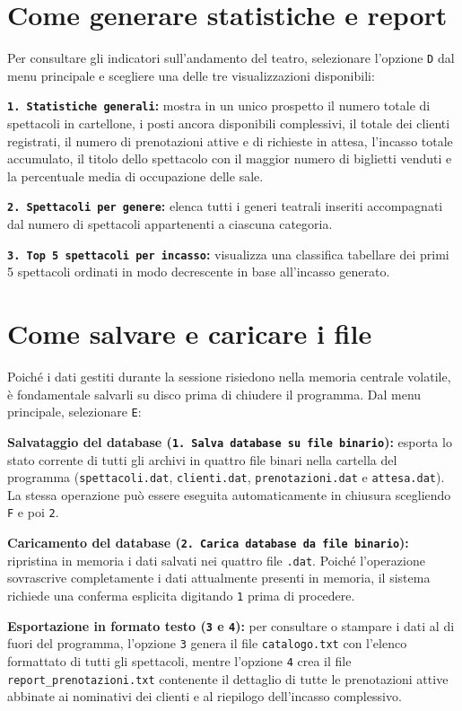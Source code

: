 \documentclass[11pt,a4paper,oneside,openany]{book}
\newenvironment{listacomp}{%
    \small
    \begin{list}{\textendash}{%
        \setlength{\topsep}{2pt}%
        \setlength{\partopsep}{0pt}%
        \setlength{\itemsep}{1pt}%
        \setlength{\parsep}{0pt}%
        \setlength{\leftmargin}{1.2em}%
    }%
}{%
    \end{list}%
}
\begin{document}
\section{Come generare statistiche e report}
Per consultare gli indicatori sull'andamento del teatro, selezionare l'opzione \texttt{D} dal menu principale e scegliere una delle tre visualizzazioni disponibili:
\begin{listacomp}
    \item \textbf{\texttt{1. Statistiche generali}:} mostra in un unico prospetto il numero totale di spettacoli in cartellone, i posti ancora disponibili complessivi, il totale dei clienti registrati, il numero di prenotazioni attive e di richieste in attesa, l'incasso totale accumulato, il titolo dello spettacolo con il maggior numero di biglietti venduti e la percentuale media di occupazione delle sale.
    \item \textbf{\texttt{2. Spettacoli per genere}:} elenca tutti i generi teatrali inseriti accompagnati dal numero di spettacoli appartenenti a ciascuna categoria.
    \item \textbf{\texttt{3. Top 5 spettacoli per incasso}:} visualizza una classifica tabellare dei primi 5 spettacoli ordinati in modo decrescente in base all'incasso generato.
\end{listacomp}

\section{Come salvare e caricare i file}
Poiché i dati gestiti durante la sessione risiedono nella memoria centrale volatile, è fondamentale salvarli su disco prima di chiudere il programma. Dal menu principale, selezionare \texttt{E}:
\begin{listacomp}
    \item \textbf{Salvataggio del database (\texttt{1. Salva database su file binario}):} esporta lo stato corrente di tutti gli archivi in quattro file binari nella cartella del programma (\texttt{spettacoli.dat}, \texttt{clienti.dat}, \texttt{prenotazioni.dat} e \texttt{attesa.dat}). La stessa operazione può essere eseguita automaticamente in chiusura scegliendo \texttt{F} e poi \texttt{2}.
    \item \textbf{Caricamento del database (\texttt{2. Carica database da file binario}):} ripristina in memoria i dati salvati nei quattro file \texttt{.dat}. Poiché l'operazione sovrascrive completamente i dati attualmente presenti in memoria, il sistema richiede una conferma esplicita digitando \texttt{1} prima di procedere.
    \item \textbf{Esportazione in formato testo (\texttt{3} e \texttt{4}):} per consultare o stampare i dati al di fuori del programma, l'opzione \texttt{3} genera il file \texttt{catalogo.txt} con l'elenco formattato di tutti gli spettacoli, mentre l'opzione \texttt{4} crea il file \texttt{report\_prenotazioni.txt} contenente il dettaglio di tutte le prenotazioni attive abbinate ai nominativi dei clienti e al riepilogo dell'incasso complessivo.
\end{listacomp}
\end{document}
